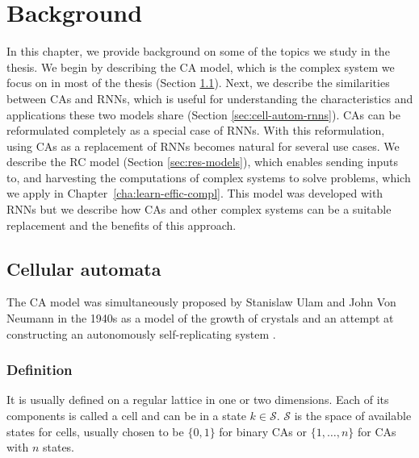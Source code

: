\chapter{Background}
\label{cha:background}
\minitoc

In this chapter, we provide background on some of the topics we study in the
thesis. We begin by describing the \acf{CA} model, which is the complex system
we focus on in most of the thesis (Section \ref{sec:cellular-automata-sec}).
Next, we describe the similarities between \acp{CA} and \acfp{RNN}, which is
useful for understanding the characteristics and applications these two models
share (Section \ref{sec:cell-autom-rnns}). \acp{CA} can be reformulated
completely as a special case of \acp{RNN}. With this reformulation, using
\acp{CA} as a replacement of \acp{RNN} becomes natural for several use cases. We
describe the \acf{RC} model (Section \ref{sec:res-models}), which enables
sending inputs to, and harvesting the computations of complex systems to solve
problems, which we apply in Chapter~\ref{cha:learn-effic-compl}. This model was
developed with \acp{RNN} but we describe how \acp{CA} and other complex systems
can be a suitable replacement and the benefits of this approach.

\section{Cellular automata}\label{sec:cellular-automata-sec}

The \acf{CA} model was simultaneously proposed by Stanislaw Ulam and John Von
Neumann in the 1940s as a model of the growth of crystals and an attempt at
constructing an autonomously self-replicating system
\parencite{vonneumannTheorySelfreproducingAutomata1966}.

\subsection{Definition}\label{sec:definition}
It is usually defined on a regular lattice in one or two dimensions. Each of its
components is called a cell and can be in a state $k \in \mathcal{S}$. $\mathcal{S}$ is the space of
available states for cells, usually chosen to be $\{0, 1\}$ for binary
\acp{CA} or $\{1, \ldots, n\}$ for \acp{CA} with $n$ states.

